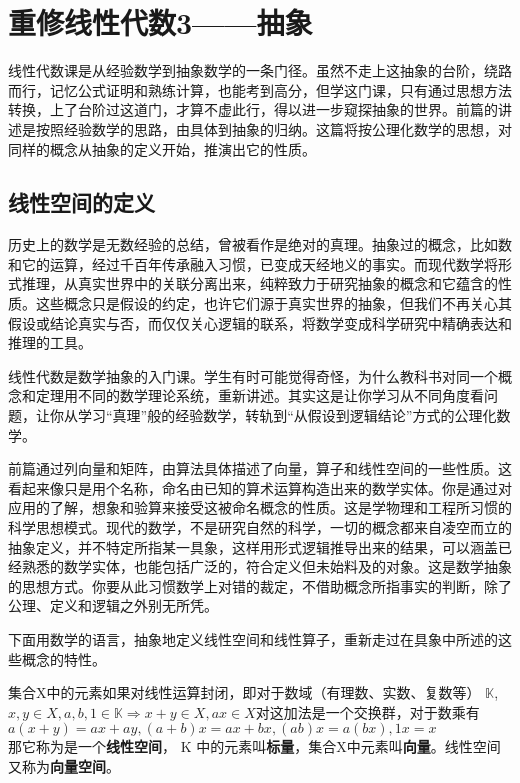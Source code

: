 
\chapter{重修线性代数3——抽象 }
线性代数课是从经验数学到抽象数学的一条门径。虽然不走上这抽象的台阶，绕路而行，记忆公式证明和熟练计算，也能考到高分，但学这门课，只有通过思想方法转换，上了台阶过这道门，才算不虚此行，得以进一步窥探抽象的世界。前篇的讲述是按照经验数学的思路，由具体到抽象的归纳。这篇将按公理化数学的思想，对同样的概念从抽象的定义开始，推演出它的性质。

\section{线性空间的定义} 

历史上的数学是无数经验的总结，曾被看作是绝对的真理。抽象过的概念，比如数和它的运算，经过千百年传承融入习惯，已变成天经地义的事实。而现代数学将形式推理，从真实世界中的关联分离出来，纯粹致力于研究抽象的概念和它蕴含的性质。这些概念只是假设的约定，也许它们源于真实世界的抽象，但我们不再关心其假设或结论真实与否，而仅仅关心逻辑的联系，将数学变成科学研究中精确表达和推理的工具。

线性代数是数学抽象的入门课。学生有时可能觉得奇怪，为什么教科书对同一个概念和定理用不同的数学理论系统，重新讲述。其实这是让你学习从不同角度看问题，让你从学习``真理''般的经验数学，转轨到``从假设到逻辑结论''方式的公理化数学。

前篇通过列向量和矩阵，由算法具体描述了向量，算子和线性空间的一些性质。这看起来像只是用个名称，命名由已知的算术运算构造出来的数学实体。你是通过对应用的了解，想象和验算来接受这被命名概念的性质。这是学物理和工程所习惯的科学思想模式。现代的数学，不是研究自然的科学，一切的概念都来自凌空而立的抽象定义，并不特定所指某一具象，这样用形式逻辑推导出来的结果，可以涵盖已经熟悉的数学实体，也能包括广泛的，符合定义但未始料及的对象。这是数学抽象的思想方式。你要从此习惯数学上对错的裁定，不借助概念所指事实的判断，除了公理、定义和逻辑之外别无所凭。

下面用数学的语言，抽象地定义线性空间和线性算子，重新走过在具象中所述的这些概念的特性。

\kaishu
集合X中的元素如果对线性运算封闭，即对于数域（有理数、实数、复数等） $\mathbb{K}$,$ x, y \in X, a, b, 1 \in \mathbb{K} \Rightarrow  x+y \in X, ax \in X $对这加法是一个交换群，对于数乘有$ a(x+y)=ax+ay, (a+b)x=ax+bx, (ab)x=a(bx),1x=x $\\
那它称为是一个\textbf{线性空间}， K 中的元素叫\textbf{标量}，集合X中元素叫\textbf{向量}。线性空间又称为\textbf{向量空间}。


